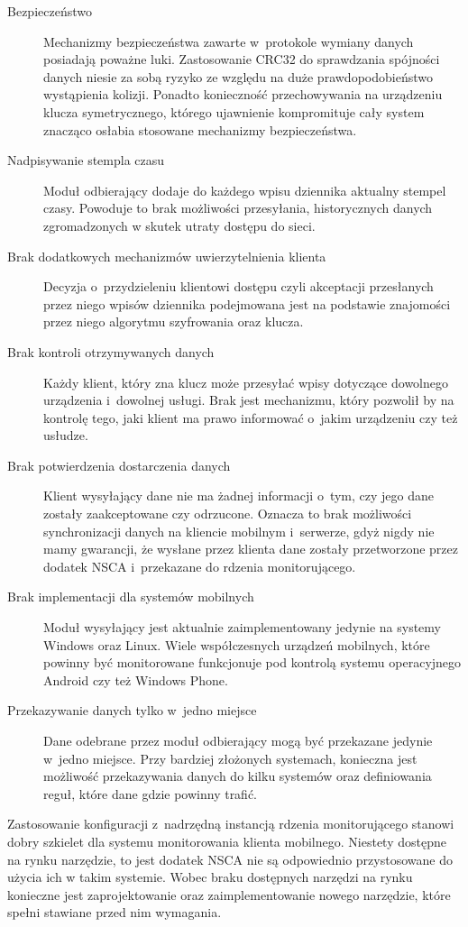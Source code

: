 \begin{description}
\item[Bezpieczeństwo] Mechanizmy bezpieczeństwa zawarte w~protokole
  wymiany danych posiadają poważne luki. Zastosowanie CRC32 do
  sprawdzania spójności danych niesie za sobą ryzyko ze względu na
  duże prawdopodobieństwo wystąpienia kolizji. Ponadto konieczność
  przechowywania na urządzeniu klucza symetrycznego, którego
  ujawnienie kompromituje cały system znacząco osłabia stosowane
  mechanizmy bezpieczeństwa.
\item[Nadpisywanie stempla czasu] Moduł odbierający dodaje do każdego
  wpisu dziennika aktualny stempel czasy. Powoduje to brak możliwości
  przesyłania, historycznych danych zgromadzonych w skutek utraty
  dostępu do sieci.
\item[Brak dodatkowych mechanizmów uwierzytelnienia klienta] Decyzja
  o~przydzieleniu klientowi dostępu czyli akceptacji przesłanych przez
  niego wpisów dziennika podejmowana jest na podstawie znajomości
  przez niego algorytmu szyfrowania oraz klucza.
\item[Brak kontroli otrzymywanych danych] Każdy klient, który zna
  klucz może przesyłać wpisy dotyczące dowolnego urządzenia i~dowolnej
  usługi. Brak jest mechanizmu, który pozwolił by na kontrolę tego,
  jaki klient ma prawo informować o~jakim urządzeniu czy też usłudze.
\item[Brak potwierdzenia dostarczenia danych] Klient wysyłający dane
  nie ma żadnej informacji o~tym, czy jego dane zostały zaakceptowane
  czy odrzucone. Oznacza to brak możliwości synchronizacji danych na
  kliencie mobilnym i~serwerze, gdyż nigdy nie mamy gwarancji, że
  wysłane przez klienta dane zostały przetworzone przez dodatek NSCA
  i~przekazane do rdzenia monitorującego.
\item[Brak implementacji dla systemów mobilnych] Moduł wysyłający jest
  aktualnie zaimplementowany jedynie na systemy Windows oraz
  Linux. Wiele współczesnych urządzeń mobilnych, które powinny być
  monitorowane funkcjonuje pod kontrolą systemu operacyjnego Android
  czy też Windows Phone.
\item[Przekazywanie danych tylko w~jedno miejsce] Dane odebrane przez
  moduł odbierający mogą być przekazane jedynie w~jedno miejsce. Przy
  bardziej złożonych systemach, konieczna jest możliwość przekazywania
  danych do kilku systemów oraz definiowania reguł, które dane gdzie
  powinny trafić.
\end{description}

Zastosowanie konfiguracji z~nadrzędną instancją rdzenia monitorującego
stanowi dobry szkielet dla systemu monitorowania klienta
mobilnego. Niestety dostępne na rynku narzędzie, to jest dodatek NSCA
nie są odpowiednio przystosowane do użycia ich w takim systemie. Wobec
braku dostępnych narzędzi na rynku konieczne jest zaprojektowanie oraz
zaimplementowanie nowego narzędzie, które spełni stawiane przed nim
wymagania.
